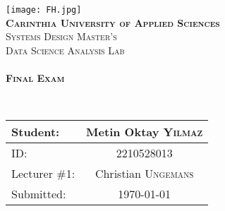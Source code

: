\begin{titlepage}
    \begin{center}
        \texttt{[image: FH.jpg]}\\[1.85cm]

        \textbf{\textsc{\Large Carinthia University of Applied Sciences}}\\[1.85cm]

        \textsc{\Large Systems Design Master's}\\[1.85cm]
        \textsc{\Large Data Science Analysis Lab}\\[1.85cm]

        \HRule \\[5mm]

        { \LARGE \bfseries \textsc{Final Exam}}

        \HRule\\[1cm]

        \vspace{2cm}

        	\begin{table}[H]
        		\centering
        		\begin{tabular}{|l|c|}
        			\toprule
        			Student: & Metin Oktay \textsc{Yilmaz} \\
        			\midrule
        			ID: & 2210528013   	\\
        			Lecturer \#1: & Christian  \textsc{Ungemans}  \\
        			Submitted: & {\large \today}  	\\
        			\bottomrule
        		\end{tabular}
        	\end{table}
    \end{center}
\end{titlepage}